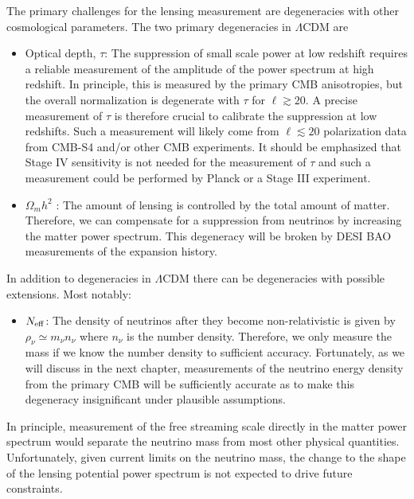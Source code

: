 The primary challenges for the lensing measurement are degeneracies with other cosmological parameters.  The two primary degeneracies in $\Lambda$CDM are
\begin{itemize}
\item Optical depth, $\tau$: The suppression of small scale power at low redshift requires a reliable measurement of the amplitude of the power spectrum at high redshift.  In principle, this is measured by the primary CMB anisotropies, but the overall normalization is degenerate with $\tau$ for $\ell \gtrsim 20$.  A precise measurement of $\tau$ is therefore crucial to calibrate the suppression at low redshifts.  Such a measurement will likely come from $\ell \lesssim 20$ polarization data from CMB-S4 and/or other CMB experiments.  It should be emphasized that Stage IV sensitivity is not needed for the measurement of $\tau$ and such a measurement could be performed by Planck or a Stage III experiment.


\item $\Omega_m h^2$ : The amount of lensing is controlled by the total amount of matter.  Therefore, we can compensate for a suppression from neutrinos by increasing the matter power spectrum.  This degeneracy will be broken by DESI BAO measurements of the expansion history.
\end{itemize}
In addition to degeneracies in $\Lambda$CDM there can be degeneracies with possible extensions.  Most notably:
\begin{itemize}
\item $N_{\rm eff}$: The density of neutrinos after they become non-relativistic is given by $\rho_\nu \simeq m_\nu n_\nu$ where $n_\nu$ is the number density.  Therefore, we only measure the mass if we know the number density to sufficient accuracy.  Fortunately, as we will discuss in the next chapter, measurements of the neutrino energy density from the primary CMB will be sufficiently accurate as to make this degeneracy insignificant under plausible assumptions.
\end{itemize}
In principle, measurement of the free streaming scale directly in the matter power spectrum would separate the neutrino mass from most other physical quantities.  Unfortunately, given current limits on the neutrino mass, the change to the shape of the lensing potential power spectrum is not expected to drive future constraints.  

